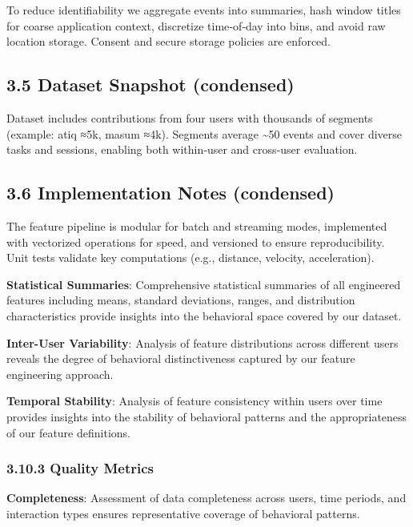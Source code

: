 \documentclass[
  11pt,
  a4paper,
]{article}
\begin{document}
To reduce identifiability we aggregate events into summaries, hash
window titles for coarse application context, discretize time‑of‑day
into bins, and avoid raw location storage. Consent and secure storage
policies are enforced.

\subsection{3.5 Dataset Snapshot
(condensed)}\label{dataset-snapshot-condensed}

Dataset includes contributions from four users with thousands of
segments (example: atiq ≈5k, masum ≈4k). Segments average
\textasciitilde50 events and cover diverse tasks and sessions, enabling
both within‑user and cross‑user evaluation.

\subsection{3.6 Implementation Notes
(condensed)}\label{implementation-notes-condensed}

The feature pipeline is modular for batch and streaming modes,
implemented with vectorized operations for speed, and versioned to
ensure reproducibility. Unit tests validate key computations (e.g.,
distance, velocity, acceleration).

\newpage

\textbf{Statistical Summaries}: Comprehensive statistical summaries of
all engineered features including means, standard deviations, ranges,
and distribution characteristics provide insights into the behavioral
space covered by our dataset.

\textbf{Inter-User Variability}: Analysis of feature distributions
across different users reveals the degree of behavioral distinctiveness
captured by our feature engineering approach.

\textbf{Temporal Stability}: Analysis of feature consistency within
users over time provides insights into the stability of behavioral
patterns and the appropriateness of our feature definitions.

\subsubsection{3.10.3 Quality Metrics}\label{quality-metrics}

\textbf{Completeness}: Assessment of data completeness across users,
time periods, and interaction types ensures representative coverage of
behavioral patterns.
\end{document}
